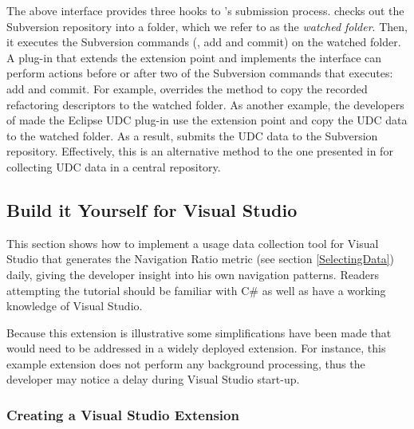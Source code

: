 The above interface provides three hooks to \CodingSpectator's submission
process. \CodingSpectator{} checks out the Subversion repository into a folder,
which we refer to as the \emph{watched folder}. Then, it executes the Subversion
commands (\eg, add and commit) on the watched folder. A plug-in that extends the
 extension point and implements the 
interface can perform actions before or after two of the Subversion commands that
\CodingSpectator{} executes: add and commit.
%
For example, \CodingSpectator{} overrides the method  to copy
the recorded refactoring descriptors to the watched folder. As another example,
the developers of \CodingSpectator{} made the Eclipse UDC plug-in use the
 extension point and copy the UDC data to the watched folder. As
a result, \CodingSpectator{} submits the UDC data to the Subversion repository.
Effectively, this is an alternative method to the one presented in
 for collecting UDC data in a central repository.

%
%


\subsection{Build it Yourself for Visual Studio}
\label{buildItYourself}

This section shows how to implement a usage data collection tool for Visual Studio that generates the Navigation Ratio metric (see section \ref{SelectingData}) daily, giving the developer insight into his own navigation patterns. Readers attempting the tutorial should be familiar with C\# as well as have a working knowledge of Visual Studio.  

Because this extension is illustrative some simplifications have been made that would need to be addressed in a widely deployed extension. For instance, this example extension does not perform any background processing, thus the developer may notice a delay during Visual Studio start-up.  


\subsubsection{Creating a Visual Studio Extension}


